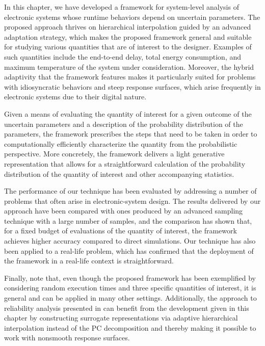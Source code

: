 In this chapter, we have developed a framework for system-level analysis of
electronic systems whose runtime behaviors depend on uncertain parameters. The
proposed approach thrives on hierarchical interpolation guided by an advanced
adaptation strategy, which makes the proposed framework general and suitable for
studying various quantities that are of interest to the designer. Examples of
such quantities include the end-to-end delay, total energy consumption, and
maximum temperature of the system under consideration. Moreover, the hybrid
adaptivity that the framework features makes it particularly suited for problems
with idiosyncratic behaviors and steep response surfaces, which arise frequently
in electronic systems due to their digital nature.

Given a means of evaluating the quantity of interest for a given outcome of the
uncertain parameters and a description of the probability distribution of the
parameters, the framework prescribes the steps that need to be taken in order to
computationally efficiently characterize the quantity from the probabilistic
perspective. More concretely, the framework delivers a light generative
representation that allows for a straightforward calculation of the probability
distribution of the quantity of interest and other accompanying statistics.

The performance of our technique has been evaluated by addressing a number of
problems that often arise in electronic-system design. The results delivered by
our approach have been compared with ones produced by an advanced sampling
technique with a large number of samples, and the comparison has shown that, for
a fixed budget of evaluations of the quantity of interest, the framework
achieves higher accuracy compared to direct simulations. Our technique has also
been applied to a real-life problem, which has confirmed that the deployment of
the framework in a real-life context is straightforward.

Finally, note that, even though the proposed framework has been exemplified by
considering random execution times and three specific quantities of interest, it
is general and can be applied in many other settings. Additionally, the approach
to reliability analysis presented in  can
benefit from the development given in this chapter by constructing surrogate
representations via adaptive hierarchical interpolation instead of the \ac{PC}
decomposition and thereby making it possible to work with nonsmooth response
surfaces.
